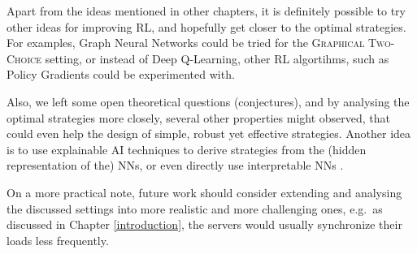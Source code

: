Apart from the ideas mentioned in other chapters, it is definitely possible to try other ideas for improving RL, and hopefully get closer to the optimal strategies. For examples, Graph Neural Networks could be tried for the \textsc{Graphical Two-Choice} setting, or instead of Deep Q-Learning, other RL algortihms, such as Policy Gradients could be experimented with. 


Also, we left some open theoretical questions (conjectures), and by analysing the optimal strategies more closely, several other properties might observed, that could even help the design of simple, robust yet effective strategies. Another idea is to use explainable AI techniques to derive strategies from the (hidden representation of the) NNs, or even directly use interpretable NNs \cite{vacareanu2022explainableAI1} \cite{tang2022explainableAI2}.

On a more practical note, future work should consider extending and analysing the discussed settings into more realistic and more challenging ones, e.g.\ as discussed in Chapter \ref{introduction}, the servers would usually synchronize their loads less frequently. 